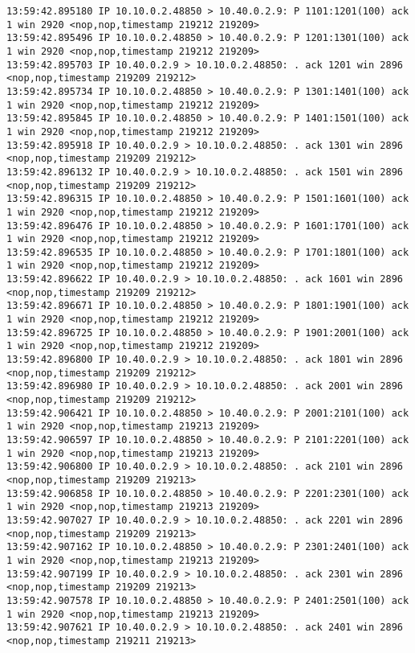 \documentclass[a4paper,12pt]{article}
\begin{document}
\begin{lstlisting}
13:59:42.895180 IP 10.10.0.2.48850 > 10.40.0.2.9: P 1101:1201(100) ack 1 win 2920 <nop,nop,timestamp 219212 219209>
13:59:42.895496 IP 10.10.0.2.48850 > 10.40.0.2.9: P 1201:1301(100) ack 1 win 2920 <nop,nop,timestamp 219212 219209>
13:59:42.895703 IP 10.40.0.2.9 > 10.10.0.2.48850: . ack 1201 win 2896 <nop,nop,timestamp 219209 219212>
13:59:42.895734 IP 10.10.0.2.48850 > 10.40.0.2.9: P 1301:1401(100) ack 1 win 2920 <nop,nop,timestamp 219212 219209>
13:59:42.895845 IP 10.10.0.2.48850 > 10.40.0.2.9: P 1401:1501(100) ack 1 win 2920 <nop,nop,timestamp 219212 219209>
13:59:42.895918 IP 10.40.0.2.9 > 10.10.0.2.48850: . ack 1301 win 2896 <nop,nop,timestamp 219209 219212>
13:59:42.896132 IP 10.40.0.2.9 > 10.10.0.2.48850: . ack 1501 win 2896 <nop,nop,timestamp 219209 219212>
13:59:42.896315 IP 10.10.0.2.48850 > 10.40.0.2.9: P 1501:1601(100) ack 1 win 2920 <nop,nop,timestamp 219212 219209>
13:59:42.896476 IP 10.10.0.2.48850 > 10.40.0.2.9: P 1601:1701(100) ack 1 win 2920 <nop,nop,timestamp 219212 219209>
13:59:42.896535 IP 10.10.0.2.48850 > 10.40.0.2.9: P 1701:1801(100) ack 1 win 2920 <nop,nop,timestamp 219212 219209>
13:59:42.896622 IP 10.40.0.2.9 > 10.10.0.2.48850: . ack 1601 win 2896 <nop,nop,timestamp 219209 219212>
13:59:42.896671 IP 10.10.0.2.48850 > 10.40.0.2.9: P 1801:1901(100) ack 1 win 2920 <nop,nop,timestamp 219212 219209>
13:59:42.896725 IP 10.10.0.2.48850 > 10.40.0.2.9: P 1901:2001(100) ack 1 win 2920 <nop,nop,timestamp 219212 219209>
13:59:42.896800 IP 10.40.0.2.9 > 10.10.0.2.48850: . ack 1801 win 2896 <nop,nop,timestamp 219209 219212>
13:59:42.896980 IP 10.40.0.2.9 > 10.10.0.2.48850: . ack 2001 win 2896 <nop,nop,timestamp 219209 219212>
13:59:42.906421 IP 10.10.0.2.48850 > 10.40.0.2.9: P 2001:2101(100) ack 1 win 2920 <nop,nop,timestamp 219213 219209>
13:59:42.906597 IP 10.10.0.2.48850 > 10.40.0.2.9: P 2101:2201(100) ack 1 win 2920 <nop,nop,timestamp 219213 219209>
13:59:42.906800 IP 10.40.0.2.9 > 10.10.0.2.48850: . ack 2101 win 2896 <nop,nop,timestamp 219209 219213>
13:59:42.906858 IP 10.10.0.2.48850 > 10.40.0.2.9: P 2201:2301(100) ack 1 win 2920 <nop,nop,timestamp 219213 219209>
13:59:42.907027 IP 10.40.0.2.9 > 10.10.0.2.48850: . ack 2201 win 2896 <nop,nop,timestamp 219209 219213>
13:59:42.907162 IP 10.10.0.2.48850 > 10.40.0.2.9: P 2301:2401(100) ack 1 win 2920 <nop,nop,timestamp 219213 219209>
13:59:42.907199 IP 10.40.0.2.9 > 10.10.0.2.48850: . ack 2301 win 2896 <nop,nop,timestamp 219209 219213>
13:59:42.907578 IP 10.10.0.2.48850 > 10.40.0.2.9: P 2401:2501(100) ack 1 win 2920 <nop,nop,timestamp 219213 219209>
13:59:42.907621 IP 10.40.0.2.9 > 10.10.0.2.48850: . ack 2401 win 2896 <nop,nop,timestamp 219211 219213>

\end{lstlisting}
\end{document}
